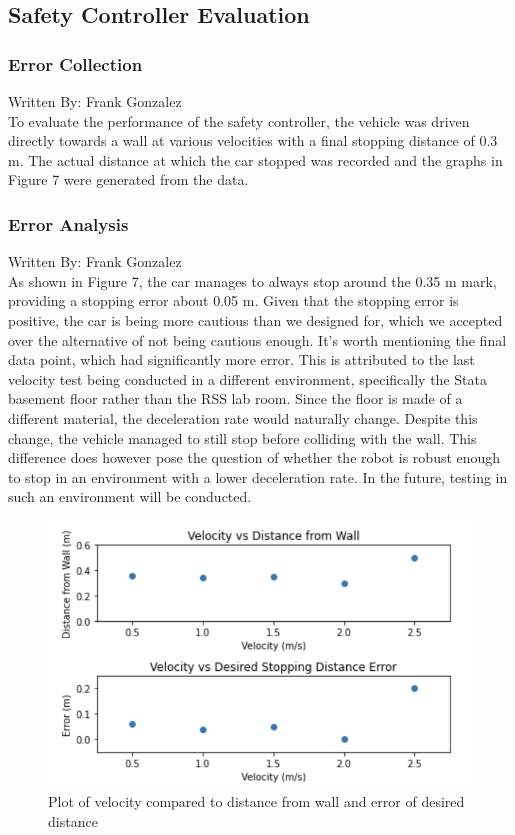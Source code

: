 \documentclass{article}
\begin{document}
\subsection{Safety Controller Evaluation}

\subsubsection{Error Collection}
Written By: Frank Gonzalez\\

To evaluate the performance of the safety controller, the vehicle was driven directly towards a wall at various velocities with a final stopping distance of 0.3 m. The actual distance at which the car stopped was recorded and the graphs in Figure 7 were generated from the data. 

\subsubsection{Error Analysis}
Written By: Frank Gonzalez\\

As shown in Figure 7, the car manages to always stop around the 0.35 m mark, providing a stopping error about 0.05 m. Given that the stopping error is positive, the car is being more cautious than we designed for, which we accepted over the alternative of not being cautious enough. It's worth mentioning the final data point, which had significantly more error. This is attributed to the last velocity test being conducted in a different environment, specifically the Stata basement floor rather than the RSS lab room. Since the floor is made of a different material, the deceleration rate would naturally change. Despite this change, the vehicle managed to still stop before colliding with the wall. This difference does however pose the question of whether the robot is robust enough to stop in an environment with a lower deceleration rate. In the future, testing in such an environment will be conducted. 

\begin{figure}[h]
\begin{center}
\includegraphics[width=.75\textwidth]{imgs/Safety_controller_error.png} %
\caption{Plot of velocity compared to distance from wall and error of desired distance}
\end{center}
\end{figure}
\end{document}
